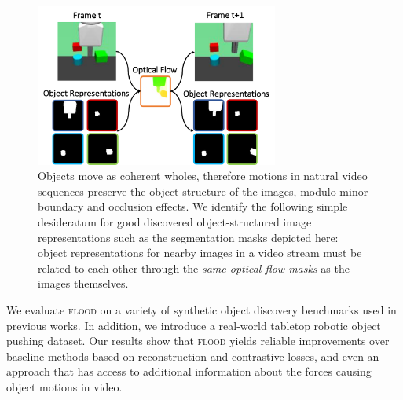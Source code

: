 \documentclass{article}
\begin{document}
\begin{figure}
    \centering
    \includegraphics[width=8cm]{figs/flood_main_figure.pdf}
    \caption{Objects move as coherent wholes, therefore motions in natural video sequences preserve the object structure of the images, modulo minor boundary and occlusion effects. We identify the following simple desideratum for good discovered object-structured image representations such as the segmentation masks depicted here: object representations for nearby images in a video stream must be related to each other through the \emph{same optical flow masks} as the images themselves.}
    \label{fig:desired_property}
\end{figure}

We evaluate \textsc{flood} on a variety of synthetic object discovery benchmarks used in previous works. In addition, we introduce a real-world tabletop robotic object pushing dataset. Our results show that \textsc{flood} yields reliable improvements over baseline methods based on reconstruction and contrastive losses, and even an approach that has access to additional information about the forces causing object motions in video.








\end{document}
